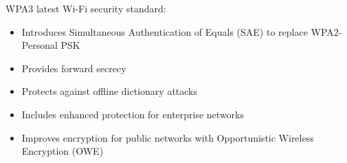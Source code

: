 \begin{definition}{WPA3}
latest Wi-Fi security standard:
\begin{itemize}
    \item Introduces Simultaneous Authentication of Equals (SAE) to replace WPA2-Personal PSK
    \item Provides forward secrecy
    \item Protects against offline dictionary attacks
    \item Includes enhanced protection for enterprise networks
    \item Improves encryption for public networks with Opportunistic Wireless Encryption (OWE)
\end{itemize}
\end{definition}

\multend